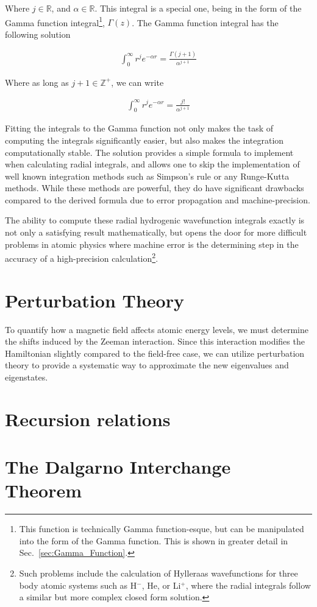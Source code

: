             Where $j \in \mathbb{R}$, and $\alpha \in \mathbb{R}$. This integral is a special one, being in the form of the Gamma function integral\footnote{This function is technically Gamma function-esque, but can be manipulated into the form of the Gamma function. This is shown in greater detail in Sec.~\ref{sec:Gamma_Function}.}, $\Gamma(z)$. The Gamma function integral has the following solution 

            \begin{align}
                \int_0^\infty r^j e^{-\alpha r} = \frac{\Gamma(j + 1)}{\alpha^{j + 1}}
            \end{align}

            Where as long as $j + 1 \in \mathbb{Z}^+$, we can write

            \begin{align}
                \int_0^\infty r^j e^{-\alpha r} = \frac{j!}{\alpha^{j + 1}}
            \end{align}

            Fitting the integrals to the Gamma function not only makes the task of computing the integrals significantly easier, but also makes the integration computationally stable. The solution provides a simple formula to implement when calculating radial integrals, and allows one to skip the implementation of well known integration methods such as Simpson's rule or any Runge-Kutta methods. While these methods are powerful, they do have significant drawbacks compared to the derived formula due to error propagation and machine-precision.
            
            The ability to compute these radial hydrogenic wavefunction integrals exactly is not only a satisfying result mathematically, but opens the door for more difficult problems in atomic physics where machine error is the determining step in the accuracy of a high-precision calculation\footnote{Such problems include the calculation of Hylleraas wavefunctions for three body atomic systems such as H$^-$, He, or Li$^+$, where the radial integrals follow a similar but more complex closed form solution.}.
            
            

    \section{Perturbation Theory} \label{sec:Perturbation_Theory}
        To quantify how a magnetic field affects atomic energy levels, we must determine the shifts induced by the Zeeman interaction. Since this interaction modifies the Hamiltonian slightly compared to the field-free case, we can utilize perturbation theory to provide a systematic way to approximate the new eigenvalues and eigenstates.
    \section{Recursion relations} \label{sec:Recursion_Relations}
    \section{The Dalgarno Interchange Theorem} \label{sec:Dalgarno_Interchange_Theorem}
    
    